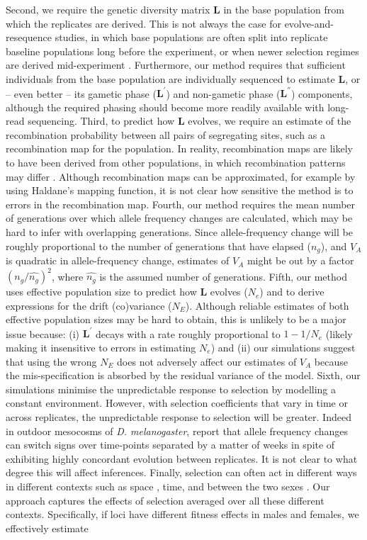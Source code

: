 \documentclass[12pt]{article}
\begin{document}
\begin{bibunit}
Second, we require the genetic diversity matrix $\textbf{L}$ in the base population from which the replicates are derived. This is not always the case for evolve-and-resequence studies, in which base populations are often split into replicate baseline populations long before the experiment, or when newer selection regimes are derived mid-experiment \citep{burke2010genome,singh2015egg,gupta2016no, robinson2023evolution}. Furthermore, our method requires that sufficient individuals from the base population are individually sequenced  to estimate  $\textbf{L}$, or -- even better --  its gametic phase ($\textbf{L}^{'}$) and non-gametic phase ($\textbf{L}^{''}$) components, although the required phasing should become more readily available with long-read sequencing. Third, to predict how $\textbf{L}$ evolves, we require an estimate of the recombination probability between all pairs of segregating sites, such as a recombination map for the population. In reality, recombination maps are likely to have been derived from other populations, in which recombination patterns may differ \citep{johnston2024understanding}. Although recombination maps can be approximated, for example by using Haldane's mapping function, it is not clear how sensitive the method is to errors in the recombination map. Fourth, our method requires the mean number of generations over which allele frequency changes are calculated, which may be hard to infer with overlapping generations. Since allele-frequency change will be roughly proportional to the number of generations that have elapsed ($n_g$), and $V_A$ is quadratic in allele-frequency change, estimates of $V_A$ might be out by a factor $(n_g/\widehat{n_g})^2$, where $\widehat{n_g}$ is the assumed number of generations. Fifth, our method uses effective population size to predict how $\textbf{L}$ evolves ($N_e$) and to derive expressions for the drift (co)variance ($N_E$). Although reliable estimates of both effective population sizes may be hard to obtain, this is unlikely to be a major issue because: (i) $\textbf{L}^{'}$ decays with a rate roughly proportional to $1 - 1/N_e$ (likely making it insensitive to errors in estimating  $N_e$)  and (ii) our simulations suggest that using the wrong $N_E$ does not adversely affect our estimates of $V_A$ because the mis-specification is absorbed by the residual variance of the model. Sixth, our simulations minimise the unpredictable response to selection by modelling a constant environment. However, with selection coefficients that vary in time or across replicates, the unpredictable response to selection will be greater. Indeed in outdoor mesocosms of \emph{D. melanogaster}, \citet{Bitter.2024} report that allele frequency changes can switch signs over time-points separated by a matter of weeks in spite of exhibiting highly concordant evolution between replicates. It is not clear to what degree this will affect inferences. Finally, selection can often act in different ways in different contexts such as space \citep{whitlock2015modern, delph2018study}, time, and between the two sexes \citep{schenkel2018making}. Our approach captures the effects of selection averaged over all these different contexts. Specifically, if loci have different fitness effects in males and females, we effectively estimate 
\end{bibunit}
\end{document}

